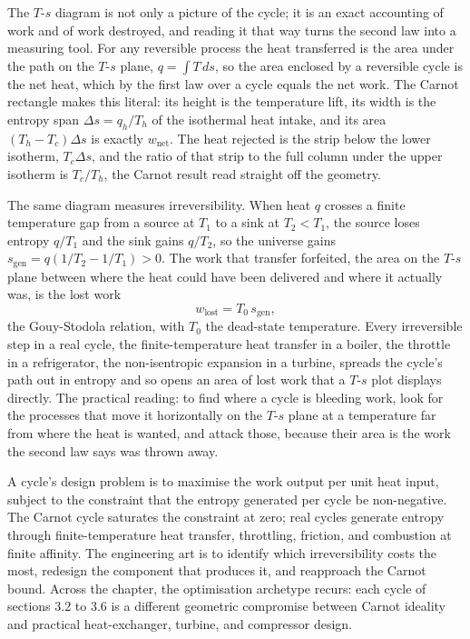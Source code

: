 \begin{mastery}
The $T$-$s$ diagram is not only a picture of the cycle; it is an exact
accounting of work and of work destroyed, and reading it that way turns
the second law into a measuring tool. For any reversible process the heat
transferred is the area under the path on the $T$-$s$ plane, $q = \int T
\, ds$, so the area enclosed by a reversible cycle is the net heat, which
by the first law over a cycle equals the net work. The Carnot rectangle
makes this literal: its height is the temperature lift, its width is the
entropy span $\Delta s = q_h/T_h$ of the isothermal heat intake, and its
area $(T_h - T_c)\Delta s$ is exactly $w_{\text{net}}$. The heat rejected
is the strip below the lower isotherm, $T_c \Delta s$, and the ratio of
that strip to the full column under the upper isotherm is $T_c/T_h$, the
Carnot result read straight off the geometry.

The same diagram measures irreversibility. When heat $q$ crosses a finite
temperature gap from a source at $T_1$ to a sink at $T_2 < T_1$, the
source loses entropy $q/T_1$ and the sink gains $q/T_2$, so the universe
gains $s_{\text{gen}} = q(1/T_2 - 1/T_1) > 0$. The work that transfer
forfeited, the area on the $T$-$s$ plane between where the heat could have
been delivered and where it actually was, is the lost work
\[
w_{\text{lost}} = T_0 \, s_{\text{gen}},
\]
the Gouy-Stodola relation, with $T_0$ the dead-state temperature. Every
irreversible step in a real cycle, the finite-temperature heat transfer
in a boiler, the throttle in a refrigerator, the non-isentropic
expansion in a turbine, spreads the cycle's path out in entropy and so
opens an area of lost work that a $T$-$s$ plot displays directly. The
practical reading: to find where a cycle is bleeding work, look for the
processes that move it horizontally on the $T$-$s$ plane at a temperature
far from where the heat is wanted, and attack those, because their area
is the work the second law says was thrown away.
\end{mastery}

\begin{archetype}
A cycle's design problem is to maximise the work output per unit heat
input, subject to the constraint that the entropy generated per cycle
be non-negative. The Carnot cycle saturates the constraint at zero;
real cycles generate entropy through finite-temperature heat
transfer, throttling, friction, and combustion at finite affinity.
The engineering art is to identify which irreversibility costs the
most, redesign the component that produces it, and reapproach the
Carnot bound. Across the chapter, the optimisation archetype recurs:
each cycle of sections 3.2 to 3.6 is a different geometric
compromise between Carnot ideality and practical heat-exchanger,
turbine, and compressor design.
\end{archetype}

